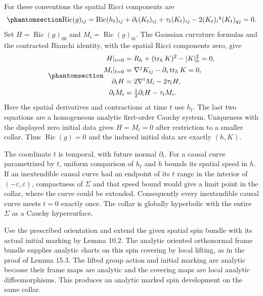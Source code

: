 \documentclass[
  english,
  11pt,
  reqno]{amsart}
\begin{document}
For these conventions the spatial Ricci components are
\begin{equation}\protect\phantomsection\label{eq:classical-analytic-spatial-ricci}{
\operatorname{Ric}(g)_{ij}
=\operatorname{Ric}(h_t)_{ij}+\partial_t(K_t)_{ij}
+\tau_t(K_t)_{ij}-2(K_t)_i{}^q(K_t)_{qj}=0.
}\end{equation} Set \(H=\operatorname{Ric}(g)_{00}\) and
\(M_i=\operatorname{Ric}(g)_{0i}\). The Gaussian curvature formulas and
the contracted Bianchi identity, with the spatial Ricci components zero,
give
\begin{equation}\protect\phantomsection\label{eq:classical-analytic-constraint-propagation}{
\begin{aligned}
H|_{t=0}&=R_h+(\operatorname{tr}_hK)^2-|K|_h^2=0,\\
M_i|_{t=0}&=\nabla^jK_{ij}-\partial_i\operatorname{tr}_hK=0,\\
\partial_tH&=2\nabla^iM_i-2\tau_tH,\\
\partial_tM_i&=\tfrac12\partial_iH-\tau_tM_i.
\end{aligned}
}\end{equation} Here the spatial derivatives and contractions at time
\(t\) use \(h_t\). The last two equations are a homogeneous analytic
first-order Cauchy system. Uniqueness with the displayed zero initial
data gives \(H=M_i=0\) after restriction to a smaller collar. Thus
\(\operatorname{Ric}(g)=0\) and the induced initial data are exactly
\((h,K)\).

The coordinate \(t\) is temporal, with future normal \(\partial_t\). For
a causal curve parametrized by \(t\), uniform comparison of \(h_t\) and
\(h\) bounds its spatial speed in \(h\). If an inextendible causal curve
had an endpoint of its \(t\) range in the interior of
\((-\varepsilon,\varepsilon)\), compactness of \(\Sigma\) and that speed
bound would give a limit point in the collar, where the curve could be
extended. Consequently every inextendible causal curve meets \(t=0\)
exactly once. The collar is globally hyperbolic with the entire
\(\Sigma\) as a Cauchy hypersurface.

Use the prescribed orientation and extend the given spatial spin bundle
with its actual initial marking by Lemma 10.2. The analytic oriented
orthonormal frame bundle supplies analytic charts on this spin covering
by local lifting, as in the proof of Lemma 15.3. The lifted group action
and initial marking are analytic because their frame maps are analytic
and the covering maps are local analytic diffeomorphisms. This produces
an analytic marked spin development on the same collar.
\end{document}
